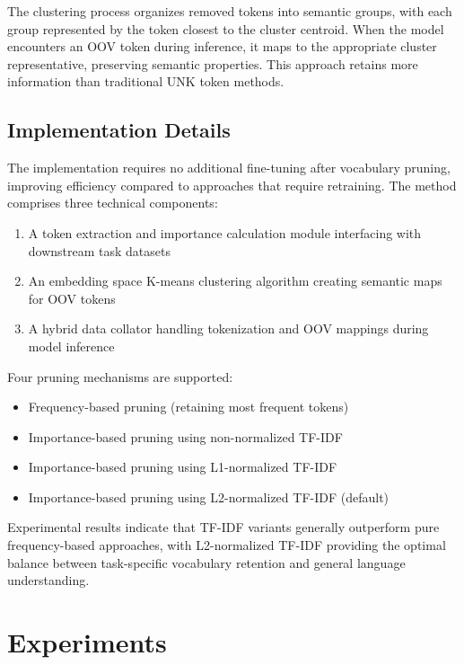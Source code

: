 \documentclass[twocolumn]{article}
\begin{document}
The clustering process organizes removed tokens into semantic groups, with each group represented by the token closest to the cluster centroid. When the model encounters an OOV token during inference, it maps to the appropriate cluster representative, preserving semantic properties. This approach retains more information than traditional UNK token methods.

\subsection{Implementation Details}
The implementation requires no additional fine-tuning after vocabulary pruning, improving efficiency compared to approaches that require retraining. The method comprises three technical components:

\begin{enumerate}
    \item A token extraction and importance calculation module interfacing with downstream task datasets
    \item An embedding space K-means clustering algorithm creating semantic maps for OOV tokens
    \item A hybrid data collator handling tokenization and OOV mappings during model inference
\end{enumerate}

Four pruning mechanisms are supported:
\begin{itemize}
    \item Frequency-based pruning (retaining most frequent tokens)
    \item Importance-based pruning using non-normalized TF-IDF
    \item Importance-based pruning using L1-normalized TF-IDF 
    \item Importance-based pruning using L2-normalized TF-IDF (default)
\end{itemize}

Experimental results indicate that TF-IDF variants generally outperform pure frequency-based approaches, with L2-normalized TF-IDF providing the optimal balance between task-specific vocabulary retention and general language understanding.


\newpage
\section{Experiments}
\end{document}
